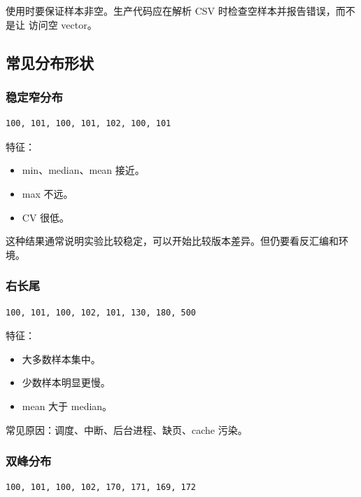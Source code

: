 使用时要保证样本非空。生产代码应在解析 CSV 时检查空样本并报告错误，而不是让  访问空 vector。

\subsection{常见分布形状}

\subsubsection{稳定窄分布}

\begin{lstlisting}
100, 101, 100, 101, 102, 100, 101
\end{lstlisting}

特征：

\begin{itemize}
  \item min、median、mean 接近。
  \item max 不远。
  \item CV 很低。
\end{itemize}

这种结果通常说明实验比较稳定，可以开始比较版本差异。但仍要看反汇编和环境。

\subsubsection{右长尾}

\begin{lstlisting}
100, 101, 100, 102, 101, 130, 180, 500
\end{lstlisting}

特征：

\begin{itemize}
  \item 大多数样本集中。
  \item 少数样本明显更慢。
  \item mean 大于 median。
\end{itemize}

常见原因：调度、中断、后台进程、缺页、cache 污染。

\subsubsection{双峰分布}

\begin{lstlisting}
100, 101, 100, 102, 170, 171, 169, 172
\end{lstlisting}

